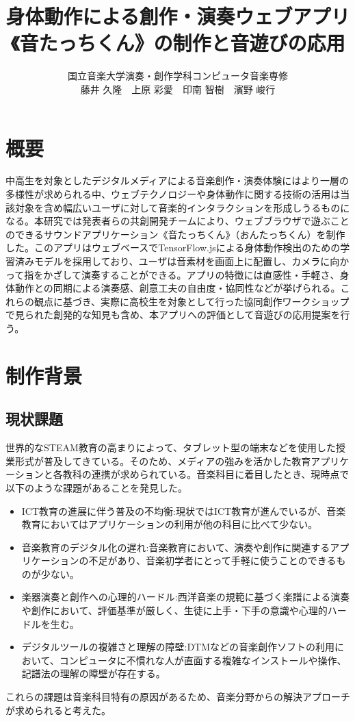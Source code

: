 \documentclass[platex,dvipdfmx]{jlreq}			%
\title{身体動作による創作・演奏ウェブアプリ\\
《音たっちくん》の制作と音遊びの応用}
\author{
国立音楽大学演奏・創作学科コンピュータ音楽専修\\
藤井 久隆　上原 彩愛　印南 智樹　濱野 峻行
}
\date{}
\begin{document}
\maketitle

\section*{概要}
中高生を対象としたデジタルメディアによる音楽創作・演奏体験にはより一層の多様性が求められる中、ウェブテクノロジーや身体動作に関する技術の活用は当該対象を含め幅広いユーザに対して音楽的インタラクションを形成しうるものになる。\cite{kakaku}本研究では発表者らの共創開発チームにより、ウェブブラウザで遊ぶことのできるサウンドアプリケーション《音たっちくん》（おんたっちくん）を制作した。このアプリはウェブベースでTensorFlow.jsによる身体動作検出のための学習済みモデルを採用しており、ユーザは音素材を画面上に配置し、カメラに向かって指をかざして演奏することができる。アプリの特徴には直感性・手軽さ、身体動作との同期による演奏感、創意工夫の自由度・協同性などが挙げられる。これらの観点に基づき、実際に高校生を対象として行った協同創作ワークショップで見られた創発的な知見も含め、本アプリへの評価として音遊びの応用提案を行う。


\section{制作背景}
\subsection{現状課題}
世界的なSTEAM教育の高まりによって、タブレット型の端末などを使用した授業形式が普及してきている。そのため、メディアの強みを活かした教育アプリケーションと各教科の連携が求められている。音楽科目に着目したとき、現時点で以下のような課題があることを発見した。
\begin{itemize}
  \item ICT教育の進展に伴う普及の不均衡:現状ではICT教育が進んでいるが、音楽教育においてはアプリケーションの利用が他の科目に比べて少ない。
  \item 音楽教育のデジタル化の遅れ:音楽教育において、演奏や創作に関連するアプリケーションの不足があり、音楽初学者にとって手軽に使うことのできるものが少ない。
  \item 楽器演奏と創作への心理的ハードル:西洋音楽の規範に基づく楽譜による演奏や創作において、評価基準が厳しく、生徒に上手・下手の意識や心理的ハードルを生む。
  \item デジタルツールの複雑さと理解の障壁:DTMなどの音楽創作ソフトの利用において、コンピュータに不慣れな人が直面する複雑なインストールや操作、記譜法の理解の障壁が存在する。
\end{itemize}
これらの課題は音楽科目特有の原因があるため、音楽分野からの解決アプローチが求められると考えた。
\end{document}
